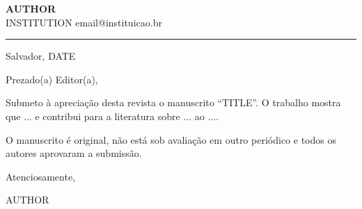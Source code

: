 \documentclass[11pt,a4paper]{article}
\begin{document}
{\large\bfseries {{AUTHOR}}}\\
{\small {{INSTITUTION}} \textbullet{} email@instituicao.br}\\[-0.4em]
{\color{tocaHoney}\rule{\linewidth}{1.2pt}}

\hfill Salvador, {{DATE}}

Prezado(a) Editor(a),

Submeto à apreciação desta revista o manuscrito ``{{TITLE}}''. O trabalho mostra que ... e contribui para a literatura sobre ... ao ....

O manuscrito é original, não está sob avaliação em outro periódico e todos os autores aprovaram a submissão.

Atenciosamente,

\vspace{2.5em}
{{AUTHOR}}
\end{document}
